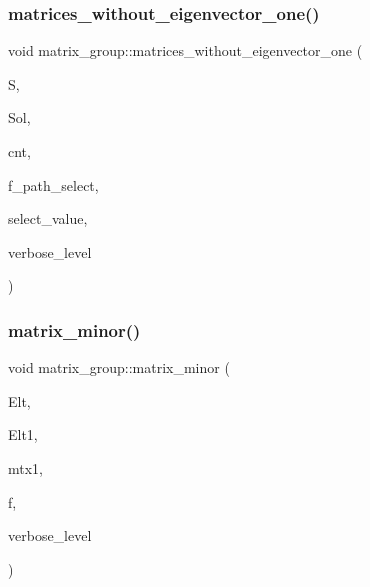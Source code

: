 \subsubsection{\texorpdfstring{matrices\+\_\+without\+\_\+eigenvector\+\_\+one()}{matrices\_without\_eigenvector\_one()}}
{\footnotesize\ttfamily void matrix\+\_\+group\+::matrices\+\_\+without\+\_\+eigenvector\+\_\+one (\begin{DoxyParamCaption}\item[{\mbox{\hyperlink{classsims}{sims}} $\ast$}]{S,  }\item[{\mbox{\hyperlink{galois_8h_a09fddde158a3a20bd2dcadb609de11dc}{I\+NT}} $\ast$\&}]{Sol,  }\item[{\mbox{\hyperlink{galois_8h_a09fddde158a3a20bd2dcadb609de11dc}{I\+NT}} \&}]{cnt,  }\item[{\mbox{\hyperlink{galois_8h_a09fddde158a3a20bd2dcadb609de11dc}{I\+NT}}}]{f\+\_\+path\+\_\+select,  }\item[{\mbox{\hyperlink{galois_8h_a09fddde158a3a20bd2dcadb609de11dc}{I\+NT}}}]{select\+\_\+value,  }\item[{\mbox{\hyperlink{galois_8h_a09fddde158a3a20bd2dcadb609de11dc}{I\+NT}}}]{verbose\+\_\+level }\end{DoxyParamCaption})}

\mbox{\label{classmatrix__group_a1eb842c65e2c0bad4a65b90c98882307}} 
\subsubsection{\texorpdfstring{matrix\+\_\+minor()}{matrix\_minor()}}
{\footnotesize\ttfamily void matrix\+\_\+group\+::matrix\+\_\+minor (\begin{DoxyParamCaption}\item[{\mbox{\hyperlink{galois_8h_a09fddde158a3a20bd2dcadb609de11dc}{I\+NT}} $\ast$}]{Elt,  }\item[{\mbox{\hyperlink{galois_8h_a09fddde158a3a20bd2dcadb609de11dc}{I\+NT}} $\ast$}]{Elt1,  }\item[{\mbox{\hyperlink{classmatrix__group}{matrix\+\_\+group}} $\ast$}]{mtx1,  }\item[{\mbox{\hyperlink{galois_8h_a09fddde158a3a20bd2dcadb609de11dc}{I\+NT}}}]{f,  }\item[{\mbox{\hyperlink{galois_8h_a09fddde158a3a20bd2dcadb609de11dc}{I\+NT}}}]{verbose\+\_\+level }\end{DoxyParamCaption})}


